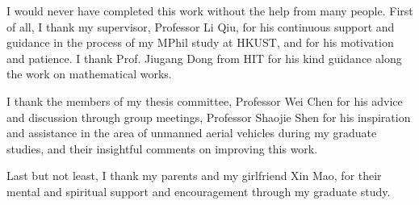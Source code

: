 \acknowledgments

I would never have completed this work without the help from many people. First of all, I thank my supervisor, Professor Li Qiu, for his continuous support and guidance in the process of my MPhil study at HKUST, and for his motivation and patience. I thank Prof. Jiugang Dong from HIT for his kind guidance along the work on mathematical works.

I thank the members of my thesis committee, Professor Wei Chen for his advice and discussion through group meetings, Professor Shaojie Shen for his inspiration and assistance in the area of unmanned aerial vehicles during my graduate studies, and their insightful comments on improving this work.

Last but not least, I thank my parents and my girlfriend Xin Mao, for their mental and spiritual support and encouragement through my graduate study.

\endacknowledgments
